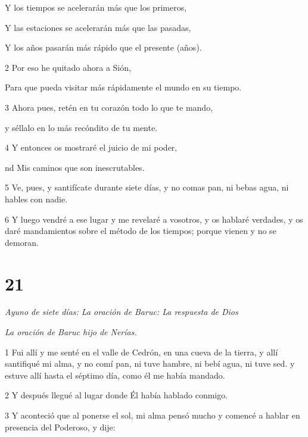 Y los tiempos se acelerarán más que los primeros,

\par Y las estaciones se acelerarán más que las pasadas,

\par Y los años pasarán más rápido que el presente (años).

\par 2 Por eso he quitado ahora a Sión,

\par Para que pueda visitar más rápidamente el mundo en su tiempo.

\par 3 Ahora pues, retén en tu corazón todo lo que te mando,

\par y séllalo en lo más recóndito de tu mente.

\par 4 Y entonces os mostraré el juicio de mi poder,

\par nd Mis caminos que son inescrutables.

\par 5 Ve, pues, y santifícate durante siete días, y no comas pan, ni bebas agua, ni hables con nadie.

\par 6 Y luego vendré a ese lugar y me revelaré a vosotros, y os hablaré verdades, y os daré mandamientos sobre el método de los tiempos; porque vienen y no se demoran.

\chapter{21}

\par \textit{Ayuno de siete días: La oración de Baruc: La respuesta de Dios}

\par \textit{La oración de Baruc hijo de Nerías.}

\par 1 Fui allí y me senté en el valle de Cedrón, en una cueva de la tierra, y allí santifiqué mi alma, y ​​no comí pan, ni tuve hambre, ni bebí agua, ni tuve sed. y estuve allí hasta el séptimo día, como él me había mandado.

\par 2 Y después llegué al lugar donde Él había hablado conmigo.

\par 3 Y aconteció que al ponerse el sol, mi alma pensó mucho y comencé a hablar en presencia del Poderoso, y dije:

